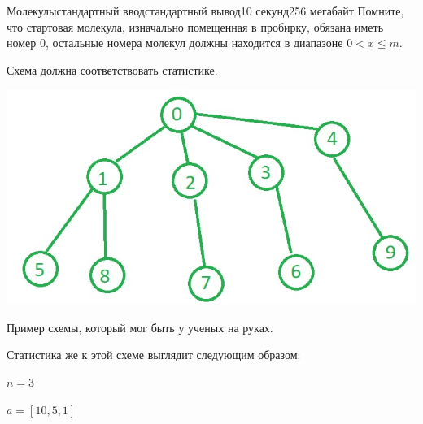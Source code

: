\begin{problem}{Молекулы}{стандартный ввод}{стандартный вывод}{10 секунд}{256 мегабайт}
Помните, что стартовая молекула, изначально помещенная в пробирку, обязана иметь номер 0, остальные номера молекул должны находится в диапазоне $0 < x \le m$.

Схема должна соответствовать статистике.  

\Example

\begin{example}
%
\end{example}

\Note
\includegraphics{example000.jpg}

Пример схемы, который мог быть у ученых на руках. 

Статистика же к этой схеме выглядит следующим образом:

$n = 3$

$a = [10, 5, 1]$

\end{problem}


